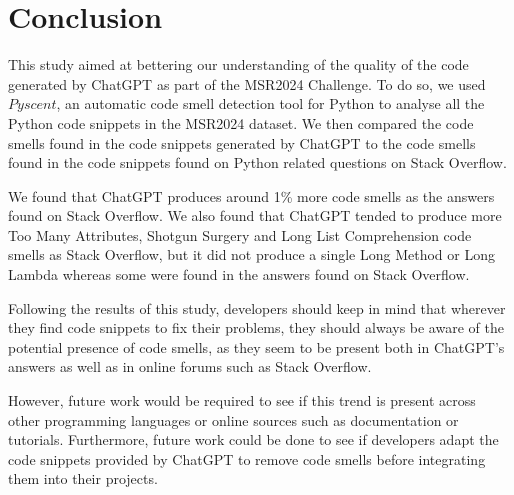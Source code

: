 
\section{Conclusion}
\label{sec:conclusion}
This study aimed at bettering our understanding of the quality of the code generated by ChatGPT as part of the MSR2024 Challenge. To do so, we used $Pyscent$, an automatic code smell detection tool for Python to analyse all the Python code snippets in the MSR2024 dataset. We then compared the code smells found in the code snippets generated by ChatGPT to the code smells found in the code snippets found on Python related questions on Stack Overflow.

We found that ChatGPT produces around 1\% more code smells as the answers found on Stack Overflow. We also found that ChatGPT tended to produce more Too Many Attributes, Shotgun Surgery and Long List Comprehension code smells as Stack Overflow, but it did not produce a single Long Method or Long Lambda whereas some were found in the answers found on Stack Overflow.

Following the results of this study, developers should keep in mind that wherever they find code snippets to fix their problems, they should always be aware of the potential presence of code smells, as they seem to be present both in ChatGPT's answers as well as in online forums such as Stack Overflow.

However, future work would be required to see if this trend is present across other programming languages or online sources such as documentation or tutorials. Furthermore, future work could be done to see if developers adapt the code snippets provided by ChatGPT to remove code smells before integrating them into their projects. \\